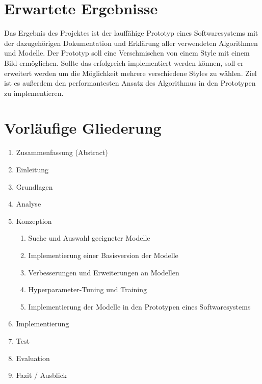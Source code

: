 \section{Erwartete Ergebnisse}
Das Ergebnis des Projektes ist der lauffähige Prototyp eines Softwaresystems mit der dazugehörigen Dokumentation und Erklärung
aller verwendeten Algorithmen und Modelle. Der Prototyp soll eine Verschmischen von einem Style mit einem Bild ermöglichen. 
Sollte das erfolgreich implementiert werden können, soll er erweitert werden um die Möglichkeit mehrere verschiedene Styles zu wählen.
Ziel ist es außerdem den performantesten Ansatz des Algorithmus in den Prototypen zu implementieren.

\pagebreak

\section{Vorläufige Gliederung}

\begin{enumerate}
	\item Zusammenfassung (Abstract)
	\item Einleitung
	\item Grundlagen
	\item Analyse
	\item Konzeption
	\begin{enumerate}[label*=\arabic*.]
		\item Suche und Auswahl geeigneter Modelle
		\item Implementierung einer Basisversion der Modelle
		\item Verbesserungen und Erweiterungen an Modellen
		\item Hyperparameter-Tuning und Training
		\item Implementierung der Modelle in den Prototypen eines Softwaresystems
	\end{enumerate}
	\item Implementierung
	\item Test
	\item Evaluation
	\item Fazit / Ausblick
\end{enumerate}

\pagebreak


\printbibliography[heading=bibintoc, filter=scientific, title={Literaturangaben}]


